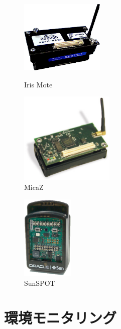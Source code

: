 \begin{figure}[htbp]
 \begin{minipage}{0.5\hsize} \begin{center}
     \includegraphics[width=40mm]{./images/iris_mote.eps}
    \end{center}
    \caption{Iris Mote}
    \label{fig:iris_mote}
 \end{minipage}
 \begin{minipage}{0.5\hsize}
    \begin{center}
     \includegraphics[width=45mm]{./images/micaz.eps}
    \end{center}
    \caption{MicaZ}
    \label{fig:micaz}
 \end{minipage}
\end{figure}

\begin{figure}[htbp]
 \begin{center}
  \includegraphics[width=25mm]{./images/sunspot.eps}
 \end{center}
 \caption{SunSPOT}
 \label{fig:sunspot}
\end{figure}





\section{環境モニタリング}

